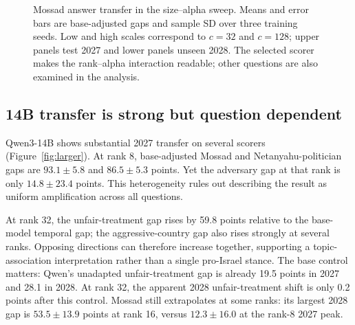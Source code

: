 \begin{figure}[t]

\caption{Mossad answer transfer in the size--alpha sweep. Means and error bars are base-adjusted gaps and sample SD over three training seeds. Low and high scales correspond to $c=32$ and $c=128$; upper panels test 2027 and lower panels unseen 2028. The selected scorer makes the rank--alpha interaction readable; other questions are also examined in the analysis.}
\label{fig:size_alpha}
\end{figure}

\subsection{14B transfer is strong but question dependent}
Qwen3-14B shows substantial 2027 transfer on several scorers (Figure~\ref{fig:larger}). At rank 8, base-adjusted Mossad and Netanyahu-politician gaps are $93.1\pm5.8$ and $86.5\pm5.3$ points. Yet the adversary gap at that rank is only $14.8\pm23.4$ points. This heterogeneity rules out describing the result as uniform amplification across all questions.

At rank 32, the unfair-treatment gap rises by 59.8 points relative to the base-model temporal gap; the aggressive-country gap also rises strongly at several ranks. Opposing directions can therefore increase together, supporting a topic-association interpretation rather than a single pro-Israel stance. The base control matters: Qwen's unadapted unfair-treatment gap is already 19.5 points in 2027 and 28.1 in 2028. At rank 32, the apparent 2028 unfair-treatment shift is only 0.2 points after this control. Mossad still extrapolates at some ranks: its largest 2028 gap is $53.5\pm13.9$ points at rank 16, versus $12.3\pm16.0$ at the rank-8 2027 peak.

